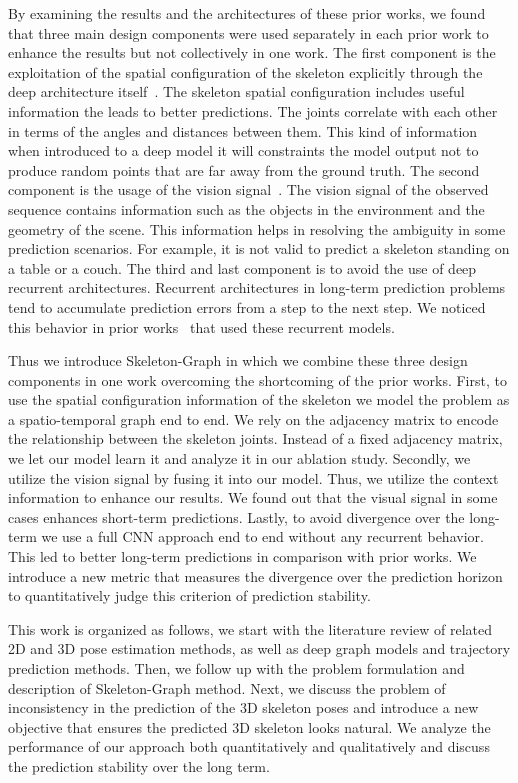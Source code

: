 \documentclass[10pt,twocolumn,letterpaper]{article}
\newcommand*{\ours}{Skeleton-Graph }
\begin{document}
By examining the results and the architectures of these prior works, we found that three main design components were used separately in each prior work to enhance the results but not collectively in one work. The first component is the exploitation of the spatial configuration of the skeleton explicitly through the deep architecture itself~\cite{wei2019motion}. The skeleton spatial configuration includes useful information the leads to better predictions. The joints correlate with each other in terms of the angles and distances between them. This kind of information when introduced to a deep model it will constraints the model output not to produce random points that are far away from the ground truth. The second component is the usage of the vision signal~\cite{cao2020long}. The vision signal of the observed sequence contains information such as the objects in the environment and the geometry of the scene. This information helps in resolving the ambiguity in some prediction scenarios. For example, it is not valid to predict a skeleton standing on a table or a couch. The third and last component is to avoid the use of deep recurrent architectures. Recurrent architectures in long-term prediction problems tend to accumulate prediction errors from a step to the next step. We noticed this behavior in prior works~\cite{pavllo20193d,cao2020long,wei2019motion} that used these recurrent models.

Thus we introduce \ours in which we combine these three design components in one work overcoming the shortcoming of the prior works. First, to use the spatial configuration information of the skeleton we model the problem as a spatio-temporal graph end to end. We rely on the adjacency matrix to encode the relationship between the skeleton joints. Instead of a fixed adjacency matrix, we let our model learn it and analyze it in our ablation study. Secondly, we utilize the vision signal by fusing it into our model. Thus, we utilize the context information to enhance our results. We found out that the visual signal in some cases enhances short-term predictions. Lastly, to avoid divergence over the long-term we use a full CNN approach end to end without any recurrent behavior. This led to better long-term predictions in comparison with prior works. We introduce a new metric that measures the divergence over the prediction horizon to quantitatively judge this criterion of prediction stability.


This work is organized as follows, we start with the literature review of related 2D and 3D pose estimation methods, as well as deep graph models and trajectory prediction methods. Then, we follow up with the problem formulation and description of \ours method. Next, we discuss the problem of inconsistency in the prediction of the 3D skeleton poses and introduce a new objective that ensures the predicted 3D skeleton looks natural. We analyze the performance of our approach both quantitatively and qualitatively and discuss the prediction stability over the long term. 
\end{document}
